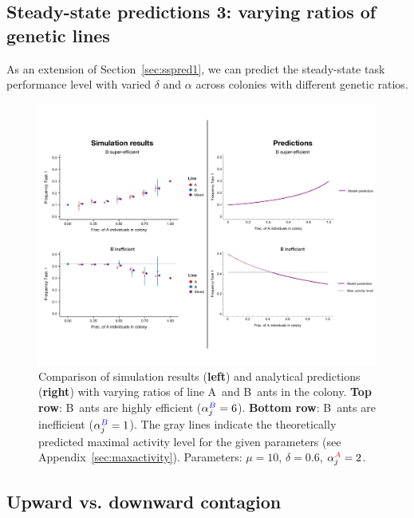 \documentclass[11pt]{article}
\newcommand{\A}{{\color{red}A}}
\newcommand{\B}{{\color{blue}B}}
\begin{document}


\subsection{Steady-state predictions 3: varying ratios of genetic lines} \label{sec:sspred3}

As an extension of Section~\ref{sec:sspred1}, we can predict the steady-state task performance level with varied $\delta$ and $\alpha$ across colonies with different genetic ratios.

\begin{figure}[H]
    \centering
    \includegraphics[trim={0 1in 0 1.1in},clip,width=0.95\linewidth]{mixes_comparison.pdf}
    \caption{Comparison of simulation results (\textbf{left}) and analytical predictions (\textbf{right}) with varying ratios of line \A\ and \B\ ants in the colony. \textbf{Top row}: \B\ ants are highly efficient ($\alpha_j^{\B}=6$). \textbf{Bottom row}: \B\ ants are inefficient ($\alpha_j^{\B}=1$). The gray lines indicate the theoretically predicted maximal activity level for the given parameters (see Appendix~\ref{sec:maxactivity}).
    Parameters: $\mu = 10$, $\delta = 0.6$, $\alpha_j^{\A} = 2$. }
    \label{fig:mixescomp}
\end{figure}

\subsection{Upward vs. downward contagion} \label{sec:sspred4}
\end{document}
